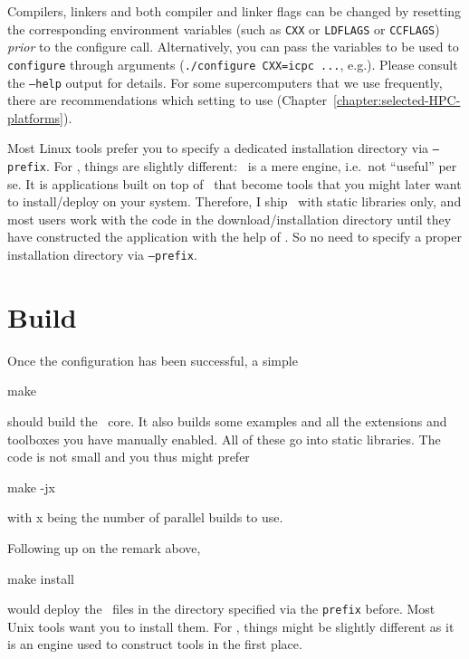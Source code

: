 \noindent
Compilers, linkers and both compiler and linker flags can be changed by
resetting the corresponding environment variables (such as
\texttt{CXX} or \texttt{LDFLAGS} or \texttt{CCFLAGS}) \emph{prior} to the
configure call.
Alternatively, you can pass the variables to be used to \texttt{configure}
	through arguments (\texttt{./configure CXX=icpc ...}, e.g.). 
Please consult the \texttt{--help} output for details.
For some supercomputers that we use frequently, there are recommendations which
setting to use (Chapter~\ref{chapter:selected-HPC-platforms}).


\begin{remark}
Most Linux tools prefer you to specify a dedicated installation directory via
\texttt{--prefix}.
For \Peano, things are slightly different: \Peano\ is a mere engine, i.e.~not
``useful'' per se.
It is applications built on top of \Peano\ that become tools that you might
later want to install/deploy on your system. 
Therefore, I ship \Peano\ with static libraries only, and most users work with
the code in the download/installation directory until they have constructed the
application with the help of \Peano.
So no need to specify a proper installation directory via \texttt{--prefix}.
\end{remark}




\section{Build}

Once the configuration has been successful, a simple 
\begin{code}
make
\end{code}
should build the \Peano\ core.
It also builds some examples and all the extensions and toolboxes you have
manually enabled.
All of these go into static libraries.
The code is not small and you thus might prefer
\begin{code}
make -jx
\end{code}
with x being the number of parallel builds to use.


\begin{remark}
 Following up on the remark above, 
 \begin{code}
make install
 \end{code}
 would deploy the \Peano\ files in the directory specified via the
 \texttt{prefix} before.
 Most Unix tools want you to install them. 
 For \Peano, things might be slightly different as it is an engine used to
 construct tools in the first place. 
\end{remark}





